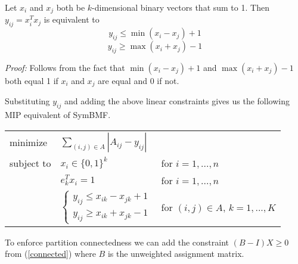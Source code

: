 \begin{lemma}
Let $x_i$ and $x_j$ both be $k$-dimensional binary vectors that sum to 1.
Then $y_{ij} = x_i^T x_j$ is equivalent to
\[ y_{ij} \leq \min (x_i - x_j) + 1 \]
\[ y_{ij} \geq \max (x_i + x_j) - 1 \]

\textit{Proof:} Follows from the fact that $\min (x_i - x_j) + 1$ and
$\max (x_i + x_j) - 1$ both equal 1 if $x_i$ and $x_j$ are equal
and 0 if not.
\end{lemma}

Substituting $y_{ij}$ and adding the above linear constraints gives us
the following MIP equivalent of SymBMF.

\begin{center}
\begin{tabular}{l l l}
minimize   & $\sum_{(i,j) \in A} |A_{ij} - y_{ij}|$ \\
subject to & $x_i \in \{0, 1\}^k$ & for $i = 1, ..., n$ \\
           & $e_k^T x_i = 1$ & for $i = 1, ..., n$ \\
           & $\begin{cases}
             y_{ij} \leq x_{ik} - x_{jk} + 1 \\
             y_{ij} \geq x_{ik} + x_{jk} - 1
             \end{cases}$
           & for $(i,j) \in A$, $k = 1, ..., K$
\end{tabular}
\end{center}

To enforce partition connectedness we can add the constraint
$(B - I) X \geq 0$ from (\ref{connected}) where $B$ is the unweighted
assignment matrix.
